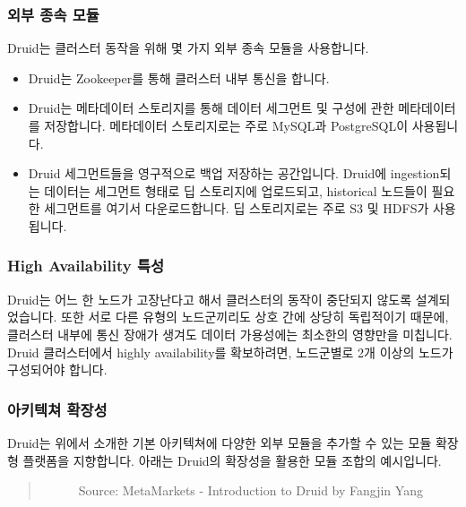 \documentclass[letterpaper,10pt,english]{sphinxmanual}
\begin{document}
\subsubsection{외부 종속 모듈}
\label{\detokenize{discovery/part01/druid_nodes:external-dependencies}}\label{\detokenize{discovery/part01/druid_nodes:id2}}
Druid는 클러스터 동작을 위해 몇 가지 외부 종속 모듈을 사용합니다.
\begin{itemize}
\item {} 
 Druid는 Zookeeper를 통해 클러스터 내부 통신을 합니다.

\item {} 
 Druid는 메타데이터 스토리지를 통해 데이터 세그먼트 및 구성에 관한 메타데이터를 저장합니다. 메타데이터 스토리지로는 주로 MySQL과 PostgreSQL이 사용됩니다.

\item {} 
 Druid 세그먼트들을 영구적으로 백업 저장하는 공간입니다. Druid에 ingestion되는 데이터는 세그먼트 형태로 딥 스토리지에 업로드되고, historical 노드들이 필요한 세그먼트를 여기서 다운로드합니다. 딥 스토리지로는 주로 S3 및 HDFS가 사용됩니다.

\end{itemize}


\subsubsection{High Availability 특성}
\label{\detokenize{discovery/part01/druid_nodes:high-availability}}\label{\detokenize{discovery/part01/druid_nodes:id3}}
Druid는 어느 한 노드가 고장난다고 해서 클러스터의 동작이 중단되지 않도록 설계되었습니다. 또한 서로 다른 유형의 노드군끼리도 상호 간에 상당히 독립적이기 때문에, 클러스터 내부에 통신 장애가 생겨도 데이터 가용성에는 최소한의 영향만을 미칩니다. Druid 클러스터에서 highly availability를 확보하려면, 노드군별로 2개 이상의 노드가 구성되어야 합니다.


\subsubsection{아키텍쳐 확장성}
\label{\detokenize{discovery/part01/druid_nodes:extensionability}}\label{\detokenize{discovery/part01/druid_nodes:id4}}
Druid는 위에서 소개한 기본 아키텍쳐에 다양한 외부 모듈을 추가할 수 있는 모듈 확장형 플랫폼을 지향합니다. 아래는 Druid의 확장성을 활용한 모듈 조합의 예시입니다.
\begin{quote}

\begin{figure}[H]
\centering
\capstart

\noindent{}
\caption{Source: MetaMarkets - Introduction to Druid by Fangjin Yang}\label{\detokenize{discovery/part01/druid_nodes:id8}}\end{figure}
\end{quote}
\end{document}

